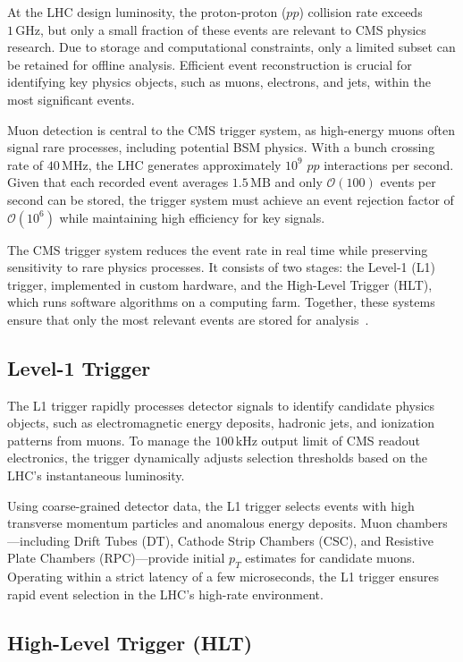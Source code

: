 At the LHC design luminosity, the proton-proton ($pp$) collision rate exceeds $1\,\mathrm{GHz}$, but only a small fraction of these events are relevant to CMS physics research. Due to storage and computational constraints, only a limited subset can be retained for offline analysis. Efficient event reconstruction is crucial for identifying key physics objects, such as muons, electrons, and jets, within the most significant events.

Muon detection is central to the CMS trigger system, as high-energy muons often signal rare processes, including potential BSM physics. With a bunch crossing rate of $40\,\mathrm{MHz}$, the LHC generates approximately $10^9$ $pp$ interactions per second. Given that each recorded event averages $1.5\,\mathrm{MB}$ and only $\mathcal{O}(100)$ events per second can be stored, the trigger system must achieve an event rejection factor of $\mathcal{O}(10^6)$ while maintaining high efficiency for key signals.

The CMS trigger system reduces the event rate in real time while preserving sensitivity to rare physics processes. It consists of two stages: the Level-1 (L1) trigger, implemented in custom hardware, and the High-Level Trigger (HLT), which runs software algorithms on a computing farm. Together, these systems ensure that only the most relevant events are stored for analysis~\cite{Cittolin:578006}.

\subsection{Level-1 Trigger}

The L1 trigger rapidly processes detector signals to identify candidate physics objects, such as electromagnetic energy deposits, hadronic jets, and ionization patterns from muons. To manage the $100\,\mathrm{kHz}$ output limit of CMS readout electronics, the trigger dynamically adjusts selection thresholds based on the LHC's instantaneous luminosity.

Using coarse-grained detector data, the L1 trigger selects events with high transverse momentum particles and anomalous energy deposits. Muon chambers—including Drift Tubes (DT), Cathode Strip Chambers (CSC), and Resistive Plate Chambers (RPC)—provide initial $p_T$ estimates for candidate muons. Operating within a strict latency of a few microseconds, the L1 trigger ensures rapid event selection in the LHC’s high-rate environment.

\subsection{High-Level Trigger (HLT)}

